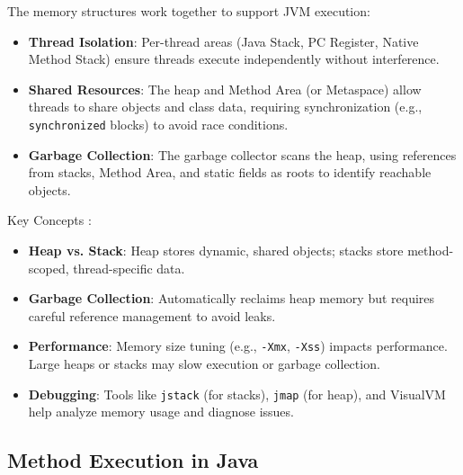 \documentclass{article}
\begin{document}
The memory structures work together to support JVM execution:
\begin{itemize}
	\item \textbf{Thread Isolation}: Per-thread areas (Java Stack, PC Register, Native Method Stack) ensure threads execute independently without interference.
	\item \textbf{Shared Resources}: The heap and Method Area (or Metaspace) allow threads to share objects and class data, requiring synchronization (e.g., \texttt{synchronized} blocks) to avoid race conditions.
	\item \textbf{Garbage Collection}: The garbage collector scans the heap, using references from stacks, Method Area, and static fields as roots to identify reachable objects.
\end{itemize}

Key Concepts :
\begin{itemize}
	\item \textbf{Heap vs. Stack}: Heap stores dynamic, shared objects; stacks store method-scoped, thread-specific data.
	\item \textbf{Garbage Collection}: Automatically reclaims heap memory but requires careful reference management to avoid leaks.
	\item \textbf{Performance}: Memory size tuning (e.g., \texttt{-Xmx}, \texttt{-Xss}) impacts performance. Large heaps or stacks may slow execution or garbage collection.
	\item \textbf{Debugging}: Tools like \texttt{jstack} (for stacks), \texttt{jmap} (for heap), and VisualVM help analyze memory usage and diagnose issues.
\end{itemize}

\subsection{Method Execution in Java}
\end{document}
